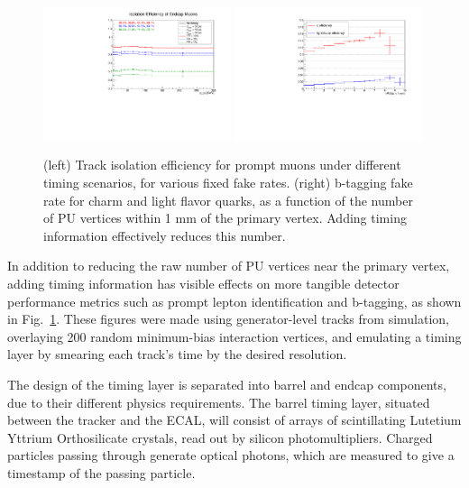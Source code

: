 \begin{figure}[t]
  \begin{center}
    \includegraphics[width=0.49\textwidth]{figs/cms/mtd_muiso.pdf}
    \includegraphics[width=0.49\textwidth]{figs/cms/mtd_btag.pdf}
    \caption{(left) Track isolation efficiency for prompt muons under different
      timing scenarios, for various fixed fake rates. (right) b-tagging fake rate
      for charm and light flavor quarks, as a function of the number of PU vertices
      within 1 mm of the primary vertex. Adding timing information effectively
      reduces this number.
            }
    \label{fig:mtd_isobtag}
  \end{center}
\end{figure}

In addition to reducing the raw number of PU vertices near the primary vertex, adding
timing information has visible effects on more tangible detector performance metrics
such as prompt lepton identification and b-tagging, as shown in  Fig.~\ref{fig:mtd_isobtag}.
These figures were made using generator-level tracks from \ttbar simulation, overlaying
200 random minimum-bias interaction vertices, and emulating a timing layer by smearing
each track's time by the desired resolution.

The design of the timing layer is separated into barrel and endcap components, due to
their different physics requirements. The barrel timing layer, situated between
the tracker and the ECAL, will consist
of arrays of scintillating Lutetium Yttrium Orthosilicate crystals, read out by silicon
photomultipliers. Charged particles passing through generate optical photons, which are
measured to give a timestamp of the passing particle.

